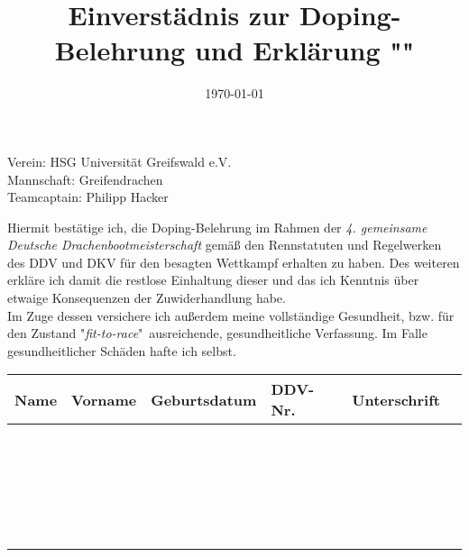 \documentclass[numbers=noenddot,a4paper]{scrartcl}
\title{Einverstädnis zur Doping-Belehrung und Erklärung "\tilt{fit-to-race}"} %
\date{\today}
\newcommand{\tilt}[1]{\textit{#1}}
\newcommand{\fett}[1]{\textbf{#1}}
\begin{document}
	
	\maketitle
	
	\begin{center}
		Verein: HSG Universität Greifswald e.V.\\
		Mannschaft: Greifendrachen\\
		Teamcaptain: Philipp Hacker
	\end{center}
	
	Hiermit bestätige ich, die Doping-Belehrung im Rahmen der \tilt{4. gemeinsame Deutsche Drachenbootmeisterschaft} gemäß den Rennstatuten und Regelwerken des DDV und DKV für den besagten Wettkampf erhalten zu haben. Des weiteren erkläre ich damit die restlose Einhaltung dieser und das ich Kenntnis über etwaige Konsequenzen der Zuwiderhandlung habe.\\
	Im Zuge dessen versichere ich außerdem meine vollständige Gesundheit, bzw. für den Zustand "\tilt{fit-to-race}"\ ausreichende, gesundheitliche Verfassung. Im Falle gesundheitlicher Schäden hafte ich selbst.
	
	\centering
	
	\vspace{1cm}
	
		\begin{tabularx}{\textwidth}{|X|X|X|X|X|X|}
			\hline  \fett{Name} & \fett{Vorname} & \fett{Geburtsdatum} & \fett{DDV-Nr.} & \fett{Unterschrift} \\ 
			\hline  &  &  &  &  \\ 
			\hline  &  &  &  &  \\ 
			\hline  &  &  &  &  \\ 
			\hline  &  &  &  &  \\ 
			\hline  &  &  &  &  \\ 
			\hline  &  &  &  &  \\ 
			\hline  &  &  &  &  \\ 
			\hline  &  &  &  &  \\ 
			\hline  &  &  &  &  \\ 
			\hline  &  &  &  &  \\ 
			\hline  &  &  &  &  \\ 
			\hline  &  &  &  &  \\ 
			\hline  &  &  &  &  \\ 
			\hline  &  &  &  &  \\ 
			\hline  &  &  &  &  \\ 
			\hline  &  &  &  &  \\ 
			\hline  &  &  &  &  \\ 
			\hline  &  &  &  &  \\ 
			\hline  &  &  &  &  \\ 
			\hline  &  &  &  &  \\ 
			\hline  &  &  &  &  \\ 
			\hline  &  &  &  &  \\ 
			\hline  &  &  &  &  \\ 
			\hline 
		\end{tabularx} 
		
\end{document}

